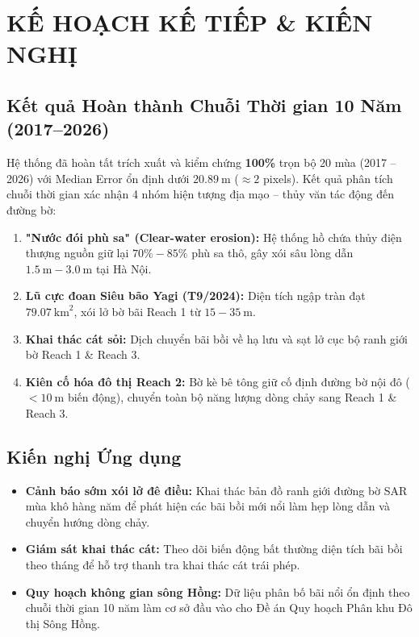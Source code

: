 \documentclass[11pt,a4paper]{article}
\begin{document}
\section{KẾ HOẠCH KẾ TIẾP \& KIẾN NGHỊ}

\subsection{Kết quả Hoàn thành Chuỗi Thời gian 10 Năm (2017--2026)}
Hệ thống đã hoàn tất trích xuất và kiểm chứng \textbf{100\%} trọn bộ 20 mùa (2017 -- 2026) với Median Error ổn định dưới $20.89~\text{m}$ ($\approx 2$ pixels). Kết quả phân tích chuỗi thời gian xác nhận 4 nhóm hiện tượng địa mạo -- thủy văn tác động đến đường bờ:
\begin{enumerate}
    \item \textbf{"Nước đói phù sa" (Clear-water erosion):} Hệ thống hồ chứa thủy điện thượng nguồn giữ lại $70\%-85\%$ phù sa thô, gây xói sâu lòng dẫn $1.5~\text{m} - 3.0~\text{m}$ tại Hà Nội.
    \item \textbf{Lũ cực đoan Siêu bão Yagi (T9/2024):} Diện tích ngập tràn đạt $79.07~\text{km}^2$, xói lở bờ bãi Reach 1 từ $15 - 35~\text{m}$.
    \item \textbf{Khai thác cát sỏi:} Dịch chuyển bãi bồi về hạ lưu và sạt lở cục bộ ranh giới bờ Reach 1 \& Reach 3.
    \item \textbf{Kiên cố hóa đô thị Reach 2:} Bờ kè bê tông giữ cố định đường bờ nội đô ($<10~\text{m}$ biến động), chuyển toàn bộ năng lượng dòng chảy sang Reach 1 \& Reach 3.
\end{enumerate}

\subsection{Kiến nghị Ứng dụng}
\begin{itemize}
    \item \textbf{Cảnh báo sớm xói lở đê điều:} Khai thác bản đồ ranh giới đường bờ SAR mùa khô hàng năm để phát hiện các bãi bồi mới nổi làm hẹp lòng dẫn và chuyển hướng dòng chảy.
    \item \textbf{Giám sát khai thác cát:} Theo dõi biến động bất thường diện tích bãi bồi theo tháng để hỗ trợ thanh tra khai thác cát trái phép.
    \item \textbf{Quy hoạch không gian sông Hồng:} Dữ liệu phân bố bãi nổi ổn định theo chuỗi thời gian 10 năm làm cơ sở đầu vào cho Đề án Quy hoạch Phân khu Đô thị Sông Hồng.
\end{itemize}
\end{document}

